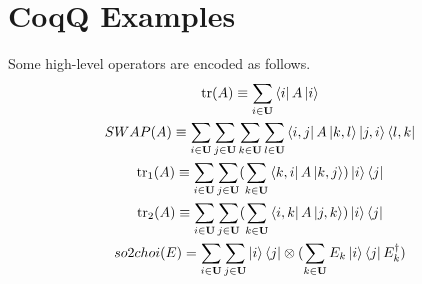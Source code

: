 \documentclass[manuscript, review, timestamp]{acmart}
\newcommand{\tr}{\mathrm{tr}}
\begin{document}
\section{CoqQ Examples}
\begin{definition}
  Some high-level operators are encoded as follows.  
  \begin{gather*}
    \tr(A) \equiv \sum_{i\in\mathbf{U}} \bra{i} A \ket{i} \\
    SWAP(A) \equiv \sum_{i\in\mathbf{U}}\sum_{j\in\mathbf{U}}\sum_{k\in\mathbf{U}}\sum_{l\in\mathbf{U}} \bra{i, j} A \ket{k, l} \ket{j, i}\bra{l, k} \\
    \tr_1(A) \equiv \sum_{i\in\mathbf{U}}\sum_{j\in\mathbf{U}} (\sum_{k\in\mathbf{U}} \bra{k, i} A \ket{k, j}) \ket{i}\bra{j} \\
    \tr_2(A) \equiv \sum_{i\in\mathbf{U}}\sum_{j\in\mathbf{U}} (\sum_{k\in\mathbf{U}} \bra{i, k} A \ket{j, k}) \ket{i}\bra{j} \\
    so2choi(E) = \sum_{i\in\mathbf{U}}\sum_{j\in\mathbf{U}} \ket{i}\bra{j} \otimes (\sum_{k\in\mathbf{U}} E_k \ket{i}\bra{j} E_k^\dagger)
  \end{gather*}
\end{definition}
\end{document}
